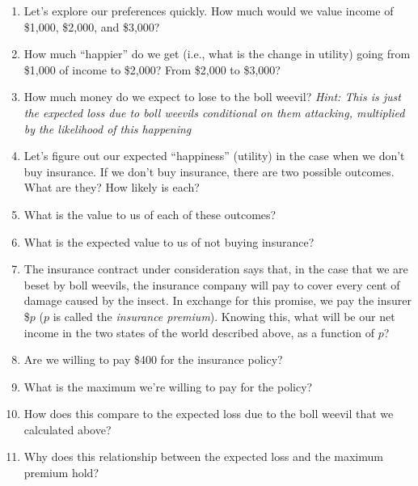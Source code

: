 \documentclass{article}
\begin{document}
\begin{enumerate}
\item Let's explore our preferences quickly. How much would we value income of \$1,000, \$2,000, and \$3,000?
\item How much ``happier'' do we get (i.e., what is the change in utility) going from \$1,000 of income to \$2,000? From \$2,000 to \$3,000?
\item How much money do we expect to lose to the boll weevil? \textit{Hint: This is just the expected loss due to boll weevils conditional on them attacking, multiplied by the likelihood of this happening}
\item Let's figure out our expected ``happiness'' (utility) in the case when we don't buy insurance. If we don't buy insurance, there are two possible outcomes. What are they? How likely is each?
\item What is the value to us of each of these outcomes?
\item What is the expected value to us of not buying insurance?
\item The insurance contract under consideration says that, in the case that we are beset by boll weevils, the insurance company will pay to cover every cent of damage caused by the insect. In exchange for this promise, we pay the insurer \$$p$ ($p$ is called the \textit{insurance premium}). Knowing this, what will be our net income in the two states of the world described above, as a function of $p$?
\item Are we willing to pay \$400 for the insurance policy?
\item What is the maximum we're willing to pay for the policy?
\item How does this compare to the expected loss due to the boll weevil that we calculated above?
\item Why does this relationship between the expected loss and the maximum premium hold?
\end{enumerate}
\end{document}
